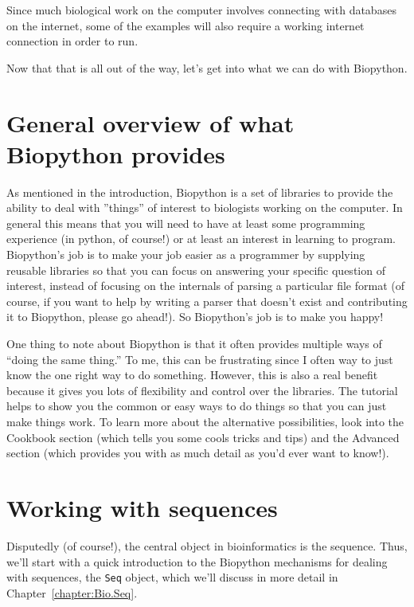 \documentclass{report}
\begin{document}
Since much biological work on the computer involves connecting with databases on the internet, some of the examples will also require a working internet connection in order to run.

Now that that is all out of the way, let's get into what we can do with Biopython.

\section{General overview of what Biopython provides}

As mentioned in the introduction, Biopython is a set of libraries to provide the ability to deal with ''things'' of interest to biologists working on the computer. In general this means that you will need to have at least some programming experience (in python, of course!) or at least an interest in learning to program. Biopython's job is to make your job easier as a programmer by supplying reusable libraries so that you can focus on answering your specific question of interest, instead of focusing on the internals of parsing a particular file format (of course, if you want to help by writing a parser that doesn't exist and contributing it to Biopython, please go ahead!). So Biopython's job is to make you happy!

One thing to note about Biopython is that it often provides multiple ways of ``doing the same thing.'' To me, this can be frustrating since I often way to just know the one right way to do something. However, this is also a real benefit because it gives you lots of flexibility and control over the libraries. The tutorial helps to show you the common or easy ways to do things so that you can just make things work. To learn more about the alternative possibilities, look into the Cookbook section (which tells you some cools tricks and tips) and the Advanced section (which provides you with as much detail as you'd ever want to know!).

\section{Working with sequences}
\label{sec:sequences}

Disputedly (of course!), the central object in bioinformatics is the sequence. Thus, we'll start with a quick introduction to the Biopython mechanisms for dealing with sequences, the \verb|Seq| object, which we'll discuss in more detail in Chapter~\ref{chapter:Bio.Seq}.
\end{document}
